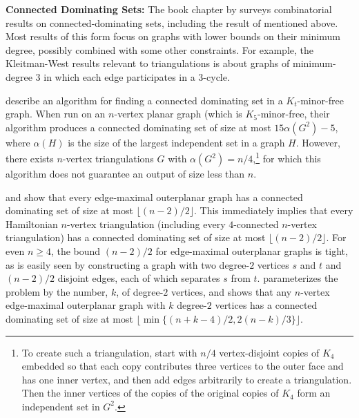 \documentclass[a4paper,UKenglish,cleveref, autoref, thm-restate]{lipics-v2021}
\newcommand{\pat}[1]{[\textcolor{red}{PM: #1}]}
\begin{document}
\noindent\textbf{Connected Dominating Sets:}
The book chapter by \citet{chellali.favaron:connected} surveys combinatorial results on connected-dominating sets, including the result of \citet{kleitman.west:spanning} mentioned above.  Most results of this form focus on graphs with lower bounds on their minimum degree, possibly combined with some other constraints.  For example, the Kleitman-West results relevant to triangulations is about graphs of minimum-degree $3$ in which each edge participates in a $3$-cycle.

\citet{wan.alzoubi.ea:simple} describe an algorithm for finding a connected dominating set in a $K_t$-minor-free graph. When run on an $n$-vertex planar graph (which is $K_5$-minor-free, their algorithm produces a connected dominating set of size at most $15\alpha(G^2)-5$, where $\alpha(H)$ is the size of the largest independent set in a graph $H$.  However, there exists $n$-vertex triangulations $G$ with $\alpha(G^2)=n/4$,\footnote{To create such a triangulation, start with $n/4$ vertex-disjoint copies of $K_4$ embedded so that each copy contributes three vertices to the outer face and has one inner vertex, and then add edges arbitrarily to create a triangulation.  Then the inner vertices of the copies of the original copies of $K_4$ form an independent set in $G^2$.} for which this algorithm does not guarantee an output of size less than $n$.

\citet{hernandez:vigilancia} and \citet{chen.hao.ea:bounds} show that every edge-maximal outerplanar graph has a connected dominating set of size at most $\lfloor (n-2)/2\rfloor$. This immediately implies that every Hamiltonian $n$-vertex triangulation (including every $4$-connected $n$-vertex triangulation) has a connected dominating set of size at most $\lfloor (n-2)/2\rfloor$.  For even $n\ge 4$, the bound $(n-2)/2$ for edge-maximal outerplanar graphs is tight, as is easily seen by constructing a graph with two degree-$2$ vertices $s$ and $t$ and $(n-2)/2$ disjoint edges, each of which separates $s$ from $t$.  \citet{zhuang:connected} parameterizes the problem by the number, $k$,  of degree-$2$ vertices, and shows that any $n$-vertex edge-maximal outerplanar graph with $k$ degree-$2$ vertices has a connected dominating set of size at most $\lfloor\min\{(n+k-4)/2,2(n-k)/3\}\rfloor$.

%
%
%
%
\end{document}
